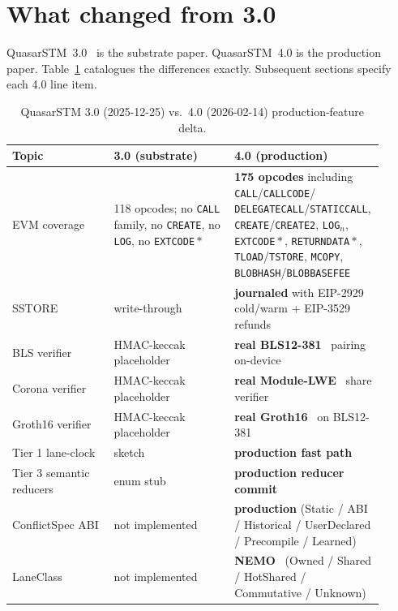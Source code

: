 \section{What changed from 3.0}

\label{sec:diff-3-to-4}

QuasarSTM~3.0~\cite{lp010-quasarstm-3} is the substrate paper.
QuasarSTM~4.0 is the production paper. Table~\ref{tab:diff34}
catalogues the differences exactly. Subsequent sections specify each
4.0 line item.

\begin{table}[ht]
\centering
\small
\caption{QuasarSTM 3.0 (2025-12-25) vs.\ 4.0 (2026-02-14)
production-feature delta.}
\label{tab:diff34}
\begin{tabular}{p{0.27\linewidth}p{0.32\linewidth}p{0.32\linewidth}}
\toprule
\textbf{Topic} & \textbf{3.0 (substrate)} & \textbf{4.0 (production)} \\
\midrule
EVM coverage & 118 opcodes; no \texttt{CALL} family, no \texttt{CREATE}, no \texttt{LOG}, no \texttt{EXTCODE}$\!*$ & \textbf{175 opcodes} including \texttt{CALL}/\texttt{CALLCODE}/ \texttt{DELEGATECALL}/\texttt{STATICCALL}, \texttt{CREATE}/\texttt{CREATE2}, \texttt{LOG}$_n$, \texttt{EXTCODE}$\!*$, \texttt{RETURNDATA}$\!*$, \texttt{TLOAD}/\texttt{TSTORE}, \texttt{MCOPY}, \texttt{BLOBHASH}/\texttt{BLOBBASEFEE} \\
SSTORE & write-through & \textbf{journaled} with EIP-2929~\cite{eip2929} cold/warm + EIP-3529~\cite{eip3529} refunds \\
BLS verifier & HMAC-keccak placeholder & \textbf{real BLS12-381}~\cite{bls12381} pairing on-device \\
Corona verifier & HMAC-keccak placeholder & \textbf{real Module-LWE}~\cite{corona} share verifier \\
Groth16 verifier & HMAC-keccak placeholder & \textbf{real Groth16}~\cite{groth2016} on BLS12-381 \\
Tier 1 lane-clock & sketch & \textbf{production fast path} \\
Tier 3 semantic reducers & enum stub & \textbf{production reducer commit} \\
ConflictSpec ABI & not implemented & \textbf{production} (Static / ABI / Historical / UserDeclared / Precompile / Learned) \\
LaneClass & not implemented & \textbf{NEMO}~\cite{nemo2025} (Owned / Shared / HotShared / Commutative / Unknown) \\

\end{tabular}
\end{table}
